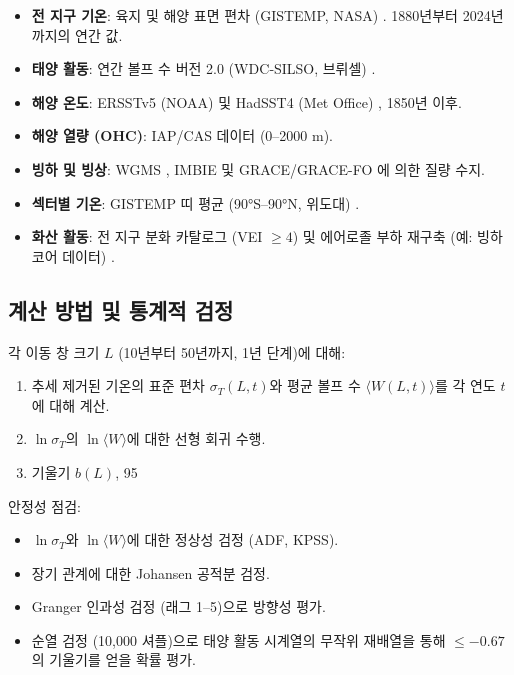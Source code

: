 \documentclass[11pt,a4paper]{article}
\begin{document}
	\begin{itemize}
		\item \textbf{전 지구 기온}: 육지 및 해양 표면 편차 (GISTEMP, NASA) \cite{GISTEMP}. 1880년부터 2024년까지의 연간 값.
		\item \textbf{태양 활동}: 연간 볼프 수 버전 2.0 (WDC‑SILSO, 브뤼셀) \cite{SILSO}.
		\item \textbf{해양 온도}: ERSSTv5 (NOAA) 및 HadSST4 (Met Office) \cite{ERSST, HADSST}, 1850년 이후.
		\item \textbf{해양 열량 (OHC)}: IAP/CAS 데이터 \cite{IAPOHC} (0–2000 m).
		\item \textbf{빙하 및 빙상}: WGMS \cite{WGMS}, IMBIE \cite{IMBIE} 및 GRACE/GRACE-FO \cite{GRACE}에 의한 질량 수지.
		\item \textbf{섹터별 기온}: GISTEMP 띠 평균 (90°S–90°N, 위도대) \cite{GISTEMPZonal}.
		\item \textbf{화산 활동}: 전 지구 분화 카탈로그 (VEI $\ge 4$) 및 에어로졸 부하 재구축 (예: 빙하 코어 데이터) \cite{VolcanoCatalog}.
	\end{itemize}
	
	\subsection{계산 방법 및 통계적 검정}
	
	각 이동 창 크기 $L$ (10년부터 50년까지, 1년 단계)에 대해:
	\begin{enumerate}
		\item 추세 제거된 기온의 표준 편차 $\sigma_T(L,t)$와 평균 볼프 수 $\langle W(L,t) \rangle$를 각 연도 $t$에 대해 계산.
		\item $\ln \sigma_T$의 $\ln \langle W \rangle$에 대한 선형 회귀 수행.
		\item 기울기 $b(L)$, 95%
	\end{enumerate}
	
	안정성 점검:
	\begin{itemize}
		\item $\ln \sigma_T$와 $\ln \langle W \rangle$에 대한 정상성 검정 (ADF, KPSS).
		\item 장기 관계에 대한 Johansen 공적분 검정.
		\item Granger 인과성 검정 (래그 1–5)으로 방향성 평가.
		\item 순열 검정 (10,000 셔플)으로 태양 활동 시계열의 무작위 재배열을 통해 $\le -0.67$의 기울기를 얻을 확률 평가.
	\end{itemize}
	
\end{document}
